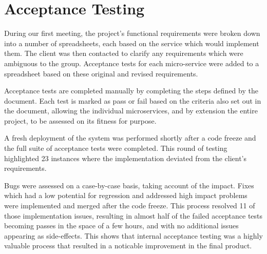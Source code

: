 \section{Acceptance Testing}
\par
During our first meeting, the project's functional requirements were broken down into a number of spreadsheets, each based on the service which would implement them. The client was then contacted to clarify any requirements which were ambiguous to the group. Acceptance tests for each micro-service were added to a spreadsheet based on these original and revised requirements.

\par
Acceptance tests are completed manually by completing the steps defined by the document. Each test is marked as pass or fail based on the criteria also set out in the document, allowing the individual microservices, and by extension the entire project, to be assessed on its fitness for purpose.

\par
A fresh deployment of the system was performed shortly after a code freeze and the full suite of acceptance tests were completed. This round of testing highlighted 23 instances where the implementation deviated from the client's requirements.

\par
Bugs were assessed on a case-by-case basis, taking account of the impact. Fixes which had a low potential for regression and addressed high impact problems were implemented and merged after the code freeze. This process resolved 11 of those implementation issues, resulting in almost half of the failed acceptance tests becoming passes in the space of a few hours, and with no additional issues appearing as side-effects. This shows that internal acceptance testing was a highly valuable process that resulted in a noticable improvement in the final product.
